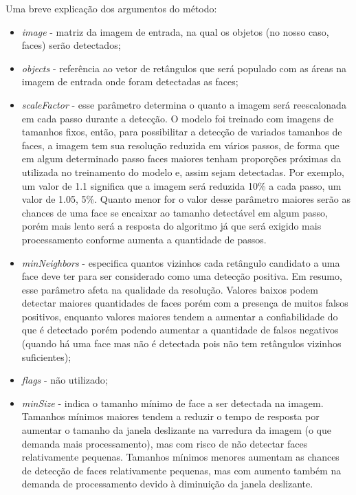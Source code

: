 
Uma breve explicação dos argumentos do método:

\begin{itemize}
    \item \emph{image} - matriz da imagem de entrada, na qual os objetos (no nosso caso, faces) serão detectados;
    \item \emph{objects} - referência ao vetor de retângulos que será populado com as áreas na imagem de entrada onde foram detectadas as faces;
    \item \emph{scaleFactor} - esse parâmetro determina o quanto a imagem será reescalonada em cada passo durante a detecção. O modelo foi treinado com imagens de tamanhos fixos, então, para possibilitar a detecção de variados tamanhos de faces, a imagem tem sua resolução reduzida em vários passos, de forma que em algum determinado passo faces maiores tenham proporções próximas da utilizada no treinamento do modelo e, assim sejam detectadas. Por exemplo, um valor de 1.1 significa que a imagem será reduzida 10\% a cada passo, um valor de 1.05, 5\%. Quanto menor for o valor desse parâmetro maiores serão as chances de uma face se encaixar ao tamanho detectável em algum passo, porém mais lento será a resposta do algoritmo já que será exigido mais processamento conforme aumenta a quantidade de passos.
    \item \emph{minNeighbors} - especifica quantos vizinhos cada retângulo candidato a uma face deve ter para ser considerado como uma detecção positiva. Em resumo, esse parâmetro afeta na qualidade da resolução. Valores baixos podem detectar maiores quantidades de faces porém com a presença de muitos falsos positivos, enquanto valores maiores tendem a aumentar a confiabilidade do que é detectado porém podendo aumentar a quantidade de falsos negativos (quando há uma face mas não é detectada pois não tem retângulos vizinhos suficientes);
    \item \emph{flags} - não utilizado;
    \item \emph{minSize} - indica o tamanho mínimo de face a ser detectada na imagem. Tamanhos mínimos maiores tendem a reduzir o tempo de resposta por aumentar o tamanho da janela deslizante na varredura da imagem (o que demanda mais processamento), mas com risco de não detectar faces relativamente pequenas. Tamanhos mínimos menores aumentam as chances de detecção de faces relativamente pequenas, mas com aumento também na demanda de processamento devido à diminuição da janela deslizante.
\end{itemize}

